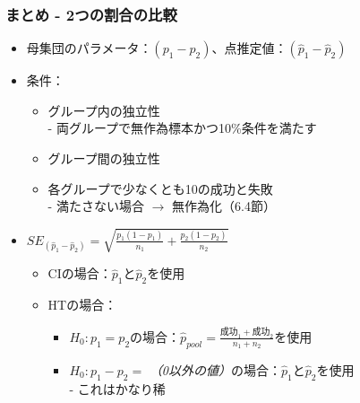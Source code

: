 \begin{frame}
\frametitle{まとめ - 2つの割合の比較}

\begin{itemize}

\item 母集団のパラメータ：$(p_1 - p_2)$、点推定値：$(\hat{p}_1 - \hat{p}_2)$

\item 条件：
\begin{itemize}
\item グループ内の独立性 \\
- 両グループで無作為標本かつ10\%条件を満たす
\item グループ間の独立性
\item 各グループで少なくとも10の成功と失敗\\
- 満たさない場合 $\rightarrow$ 無作為化（6.4節）
\end{itemize}

\item $SE_{(\hat{p}_1 - \hat{p}_2)} = \sqrt{ \frac{p_1(1-p_1)}{n_1} + \frac{p_2(1-p_2)}{n_2} }$
\begin{itemize}
\item CIの場合：$\hat{p}_1$と$\hat{p}_2$を使用
\item HTの場合：
\begin{itemize}
\item $H_0: p_1 = p_2$の場合：$\hat{p}_{pool} = \frac{\text{成功}_1 + \text{成功}_2}{n_1 + n_2}$を使用
\item $H_0: p_1 - p_2 = $ \textit{（0以外の値）}の場合：$\hat{p}_1$と$\hat{p}_2$を使用 \\
- これはかなり稀
\end{itemize}
\end{itemize}

\end{itemize}

\end{frame}


